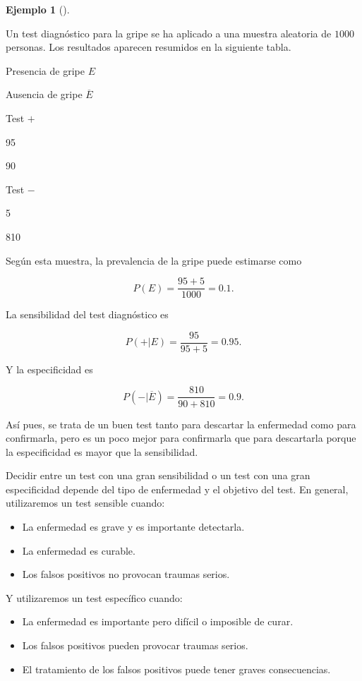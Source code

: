 \documentclass[
  a4paper,
]{scrreport}
\providecommand{\tightlist}{%
  \setlength{\itemsep}{0pt}\setlength{\parskip}{0pt}}\usepackage{longtable,booktabs,array}
\theoremstyle{plain}
\theoremstyle{definition}
\theoremstyle{definition}
\newtheorem{example}{Ejemplo}[chapter]
\theoremstyle{remark}
\begin{document}
\begin{example}[]\protect\hypertarget{exm-sensibilidad-especificidad}{}\label{exm-sensibilidad-especificidad}

Un test diagnóstico para la gripe se ha aplicado a una muestra aleatoria
de \(1000\) personas. Los resultados aparecen resumidos en la siguiente
tabla.

Presencia de gripe \(E\)

Ausencia de gripe \(\overline E\)

Test \(+\)

95

90

Test \(−\)

5

810

Según esta muestra, la prevalencia de la gripe puede estimarse como

\[P(E) = \frac{95+5}{1000} = 0.1.\]

La sensibilidad del test diagnóstico es

\[P(+|E) = \frac{95}{95+5}= 0.95.\]

Y la especificidad es

\[P(-|\overline{E}) = \frac{810}{90+810}=0.9.\]

Así pues, se trata de un buen test tanto para descartar la enfermedad
como para confirmarla, pero es un poco mejor para confirmarla que para
descartarla porque la especificidad es mayor que la sensibilidad.

\end{example}

Decidir entre un test con una gran sensibilidad o un test con una gran
especificidad depende del tipo de enfermedad y el objetivo del test. En
general, utilizaremos un test sensible cuando:

\begin{itemize}
\tightlist
\item
  La enfermedad es grave y es importante detectarla.
\item
  La enfermedad es curable.
\item
  Los falsos positivos no provocan traumas serios.
\end{itemize}

Y utilizaremos un test específico cuando:

\begin{itemize}
\tightlist
\item
  La enfermedad es importante pero difícil o imposible de curar.
\item
  Los falsos positivos pueden provocar traumas serios.
\item
  El tratamiento de los falsos positivos puede tener graves
  consecuencias.
\end{itemize}
\end{document}
